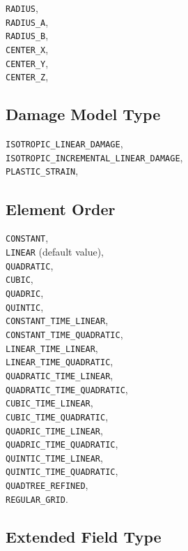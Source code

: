 \documentclass[10pt]{article}
\begin{document}
\verb+RADIUS+,\\
\verb+RADIUS_A+,\\
\verb+RADIUS_B+,\\
\verb+CENTER_X+,\\
\verb+CENTER_Y+,\\
\verb+CENTER_Z+,

\subsection{Damage Model Type}

\verb+ISOTROPIC_LINEAR_DAMAGE+,\\
\verb+ISOTROPIC_INCREMENTAL_LINEAR_DAMAGE+,\\
\verb+PLASTIC_STRAIN+,


\subsection{Element Order}

	\verb+CONSTANT+, \\
	\verb+LINEAR+ (default value), \\
	\verb+QUADRATIC+,\\
    \verb+CUBIC+,\\
    \verb+QUADRIC+,\\
    \verb+QUINTIC+,\\
    \verb+CONSTANT_TIME_LINEAR+,\\
    \verb+CONSTANT_TIME_QUADRATIC+,\\
    \verb+LINEAR_TIME_LINEAR+,\\
    \verb+LINEAR_TIME_QUADRATIC+,\\
    \verb+QUADRATIC_TIME_LINEAR+,\\
    \verb+QUADRATIC_TIME_QUADRATIC+,\\
    \verb+CUBIC_TIME_LINEAR+,\\
    \verb+CUBIC_TIME_QUADRATIC+,\\
    \verb+QUADRIC_TIME_LINEAR+,\\
    \verb+QUADRIC_TIME_QUADRATIC+,\\
    \verb+QUINTIC_TIME_LINEAR+,\\
    \verb+QUINTIC_TIME_QUADRATIC+,\\
    \verb+QUADTREE_REFINED+,\\
    \verb+REGULAR_GRID+.

\subsection{Extended Field Type}
\end{document}
